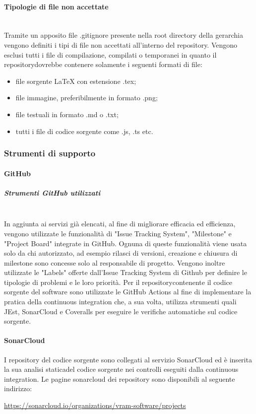 	\paragraph{Tipologie di file non accettate}\mbox{}\\ [1mm]
		Tramite un apposito file .gitignore presente nella root directory della gerarchia vengono definiti i tipi di file non accettati all'interno del repository\glo. Vengono esclusi tutti i file di compilazione, compilati o temporanei in quanto il repository\glosp dovrebbe contenere solamente i seguenti formati di file:
		\begin{itemize}
			\item file sorgente \LaTeX \xspace con estensione .tex;
			\item file immagine, preferibilmente in formato .png;
			\item file testuali in formato .md o .txt;
			\item tutti i file di codice sorgente come .js, .ts etc.		
		\end{itemize}
	\subsubsection{Strumenti di supporto}
	\paragraph{GitHub}
	\subparagraph*{Strumenti GitHub utilizzati}\mbox{}\\ [1mm]
		In aggiunta ai servizi già elencati, al fine di migliorare efficacia ed efficienza, vengono utilizzate le funzionalità di "Issue Tracking System",
		"Milestone" e "Project Board" integrate in GitHub. Ognuna di queste funzionalità viene usata solo da chi autorizzato, ad esempio rilasci di versioni, creazione e chiusura di milestone sono concesse solo al responsabile di progetto\glo.
		\newline
		Vengono inoltre utilizzate le "Labels" offerte dall'Issue Tracking System di Github per definire le tipologie di problemi e le loro priorità.
		\newline
		Per il repository\glosp contenente il codice sorgente del software sono utilizzate le GitHub Actions al fine di implementare la pratica della continuous integration che, a sua volta, utilizza strumenti quali JEst, SonarCloud e Coveralls per eseguire le verifiche automatiche sul codice sorgente.
	\paragraph{SonarCloud}
	I repository del codice sorgente sono collegati al servizio SonarCloud ed è inserita la sua analisi statica\glosp del codice sorgente nei controlli eseguiti dalla continuous integration. Le pagine sonarcloud dei repository sono disponibili al seguente indirizzo: 
	\begin{center}
		\url{https://sonarcloud.io/organizations/vram-software/projects}
	\end{center}
